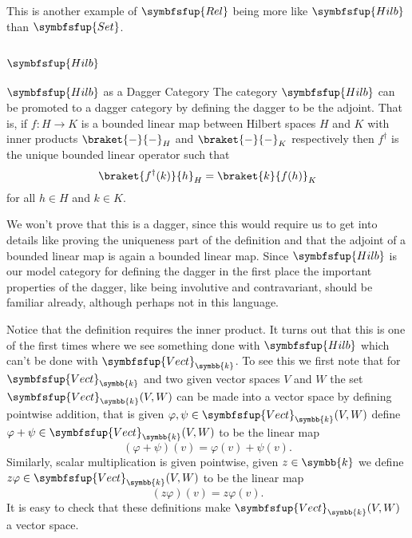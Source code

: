 \documentclass[fleqn]{NotesClass}
\makeatletter
\newcommand{\c@egory}[1]{\symbfsfup{#1}}
\newcommand{\Set}{\c@egory{Set}}
\newcommand{\Rel}{\c@egory{Rel}}
\renewcommand{\field}{\symbb{k}}
\newcommand{\Vect}[1][\field]{{\c@egory{Vect}_{#1}}}
\newcommand{\Hilb}{\c@egory{Hilb}}
\makeatother
\begin{document}
    This is another example of \(\Rel\) being more like \(\Hilb\) than \(\Set\).
    
    \subsection{\texorpdfstring{\(\Hilb\)}{Hilb}}
    \begin{dfn}{{\normalsize\(\Hilb\)} as a Dagger Category}{}
        The category \(\Hilb\)\index{Hilb@\(\Hilb\)!as a dagger category} can be promoted to a dagger category by defining the dagger to be the adjoint.
        That is, if \(f \colon H \to K\) is a bounded linear map between Hilbert spaces \(H\) and \(K\) with inner products \(\braket{-}{-}_H\) and \(\braket{-}{-}_K\) respectively then \(f^{\dagger}\) is the unique bounded linear operator such that
        \begin{equation}
            \braket{f^\dagger(k)}{h}_{H} = \braket{k}{f(h)}_{K}
        \end{equation}
        for all \(h \in H\) and \(k \in K\).
    \end{dfn}
    
    We won't prove that this is a dagger, since this would require us to get into details like proving the uniqueness part of the definition and that the adjoint of a bounded linear map is again a bounded linear map.
    Since \(\Hilb\) is our model category for defining the dagger in the first place the important properties of the dagger, like being involutive and contravariant, should be familiar already, although perhaps not in this language.
    
    Notice that the definition requires the inner product.
    It turns out that this is one of the first times where we see something done with \(\Hilb\) which can't be done with \(\Vect\).
    To see this we first note that for \(\Vect\) and two given vector spaces \(V\) and \(W\) the set \(\Vect(V, W)\) can be made into a vector space by defining pointwise addition, that is given \(\varphi, \psi \in \Vect(V, W)\) define \(\varphi + \psi \in \Vect(V, W)\) to be the linear map
    \begin{equation}
        (\varphi + \psi)(v) = \varphi(v) + \psi(v).
    \end{equation}
    Similarly, scalar multiplication is given pointwise, given \(z \in \field\) we define \(z\varphi \in \Vect(V, W)\) to be the linear map
    \begin{equation}
        (z\varphi)(v) = z\varphi(v).
    \end{equation}
    It is easy to check that these definitions make \(\Vect(V, W)\) a vector space.
    
\end{document}
